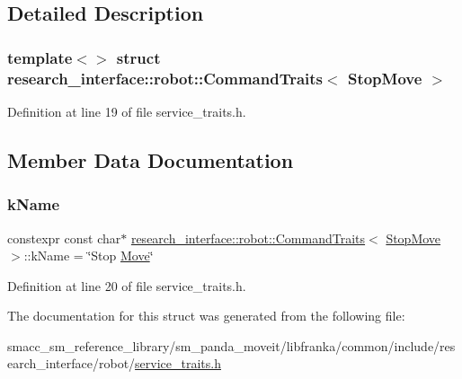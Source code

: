 \subsection{Detailed Description}
\subsubsection*{template$<$$>$\newline
struct research\+\_\+interface\+::robot\+::\+Command\+Traits$<$ Stop\+Move $>$}



Definition at line 19 of file service\+\_\+traits.\+h.



\subsection{Member Data Documentation}
\mbox{\label{structresearch__interface_1_1robot_1_1CommandTraits_3_01StopMove_01_4_af5cd5ed7a2c39f9ed78fcf4e05e11667}} 
\subsubsection{\texorpdfstring{k\+Name}{kName}}
{\footnotesize\ttfamily constexpr const char$\ast$ \hyperlink{structresearch__interface_1_1robot_1_1CommandTraits}{research\+\_\+interface\+::robot\+::\+Command\+Traits}$<$ \hyperlink{structresearch__interface_1_1robot_1_1StopMove}{Stop\+Move} $>$\+::k\+Name = \char`\"{}Stop \hyperlink{structresearch__interface_1_1robot_1_1Move}{Move}\char`\"{}\hspace{0.3cm}{\ttfamily [static]}}



Definition at line 20 of file service\+\_\+traits.\+h.



The documentation for this struct was generated from the following file\+:\begin{DoxyCompactItemize}
\item 
smacc\+\_\+sm\+\_\+reference\+\_\+library/sm\+\_\+panda\+\_\+moveit/libfranka/common/include/research\+\_\+interface/robot/\hyperlink{service__traits_8h}{service\+\_\+traits.\+h}\end{DoxyCompactItemize}
